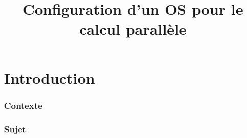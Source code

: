 \documentclass[final]{polytech/polytech}
\title{Configuration d’un OS pour le calcul parallèle}
\begin{document}
\part{Introduction}

\vspace{1\baselineskip} %

\vfill\eject %

\section{Contexte}

\section{Sujet}

\end{document}
